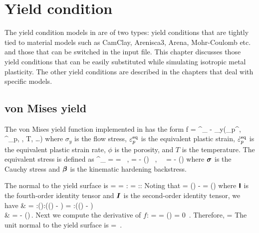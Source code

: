 \chapter{Yield condition}

The yield condition models in \Vaango are of two types: yield conditions that are
tightly tied to material models such as CamClay, Arenisca3, Arena, Mohr-Coulomb 
etc. and those that can be switched in the input file.  This chapter discusses
those yield conditions that can be easily substituted while simulating isotropic
metal plasticity.  The other yield conditions are described in the chapters that
deal with specific models.

\section{von Mises yield}
  The von Mises yield function implemented in \Vaango has the form
  \Beq
    f = \sigma^\xi_{\Teff} - \sigma_y(\Veps_p^\Teq, \dot{\Veps}^\Teq_p, \phi, T, \dots)
  \Eeq 
  where $\sigma_y$ is the flow stress, $\varepsilon_p^{\text{eq}}$ is the equivalent plastic strain,
  $\dot{\varepsilon}^{\text{eq}}_p$ is the equivalent plastic strain rate, $\phi$ is the
  porosity, and $T$ is the temperature.  The equivalent stress is defined as
  \Beq \label{eq:equiv_stress}
    \sigma^\xi_{\Teff} =  =  ~,\quad
    \Bxi =  \BsT - \Dev(\Bbeta) ~,~~ \BsT = \Bsig - \Third \Tr(\Bsig)\BI
  \Eeq
  where $\boldsymbol{\sigma}$ is the Cauchy stress and $\boldsymbol{\beta}$ is the kinematic hardening backstress.

  The normal to the yield surface is 
  \Beq
    \BN = 
        = :\Partial{\Bxi}{\Bsig}
        = :\Partial{\Bxi}{\BsT}:\Partial{\BsT}{\Bsig}
  \Eeq
  Noting that
  \Beq
    \Partial{\BsT}{\Bsig} = \Tsym(\SfI) - \Third \BI\otimes\BI
    \quad \Tand \quad
    \Partial{\Bxi}{\BsT} = \Tsym(\SfI)
  \Eeq
  where $\boldsymbol{\mathsf{I}}$ is the fourth-order identity tensor and $\boldsymbol{I}$ is the second-order
  identity tensor, we have
  \Beq \label{eq:df_dxi}
    \Bal
      \BN & = :\Tsym(\SfI):(\Tsym(\SfI) - \Third \BI\otimes\BI)
            = :(\Tsym(\SfI) - \Third \BI\otimes\BI) \\
          & =  - \Third \Tr\left(\right)\BI \,.
    \Eal
  \Eeq
  Next we compute the derivative of $f$:
  \Beq
     =  \Partial{\sigma^\xi_\Teff}{\Bxi}
     =  \frac{\Bxi}{\sqrt{\Bxi:\Bxi}} 
    \quad \implies \quad
    \Tr\left(\right) = 0 \,.
  \Eeq
  Therefore,
  \Beq
    \BN =  \frac{\Bxi}{\Norm{\Bxi}{}}
  \Eeq
  The unit normal to the yield surface is
  \Beq
    \hat{\BN} = \frac{\Bxi}{\Norm{\Bxi}{}} \,.
  \Eeq
  

